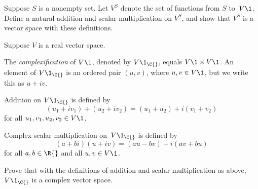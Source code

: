 \exercise
Suppose $S$ is a nonempty set. Let $V^S$ denote the set of functions from $S$ to~$V\1$. Define a natural addition and scalar multiplication on $V^S\!$, and show that $V^S$ is a vector space with these definitions.


\exercise
Suppose $V$ is a real vector space.
\vspace{-.075in}
\begin{Itemize}
\item
The \emph{complexification} of $V\1$, denoted by $V\1_{\C{}}$, equals $V\1 \times V\1$. An element of $V\1_{\C{}}$ is an ordered pair $(u, v)$, where $u, v \in V\1$, but we write this as $u + iv$.
\item
Addition on $V\1_{\C{}}$ is defined by\label{1VC}
\[
(u_1 + i v_1) + (u_2 + i v_2) = (u_1 + u_2) + i (v_1 + v_2)
\]
for all $u_1, v_1, u_2, v_2 \in V\1$.
\item
Complex scalar multiplication on~$V\1_{\C{}}$ is defined by
\[
(a + bi)(u + iv) = (au - bv) + i(av + bu)
\]
for all $a, b \in \R{}$ and all $u, v \in V\1$.
\end{Itemize}
Prove that with the definitions of addition and
scalar multiplication as above, $V\1_{\C{}}$ is a complex vector space.


